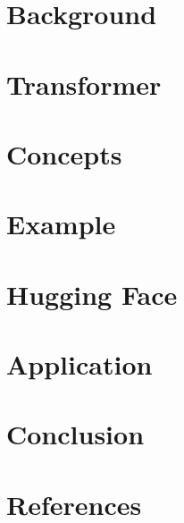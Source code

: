 \section[Back]{Background}


\section[Trs]{Transformer}


\section[Concepts]{Concepts}


\section[Ex]{Example}


\section[HF]{Hugging Face}


\section[Appln]{Application}


\section[Cncl]{Conclusion}


\section[Refs]{References}
